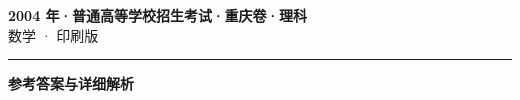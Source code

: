 \documentclass[zihao=5, a4paper]{ctexart}
\begin{document}
\begin{center}
  {\Large\bfseries 2004 年·普通高等学校招生考试·重庆卷·理科}\\[4pt]
  {\large 数学 · 印刷版}
\end{center}
\medskip
{}

\par\bigskip\hrule\bigskip
{}
\begin{center}{\large\bfseries 参考答案与详细解析}\end{center}
\smallskip

\end{document}
